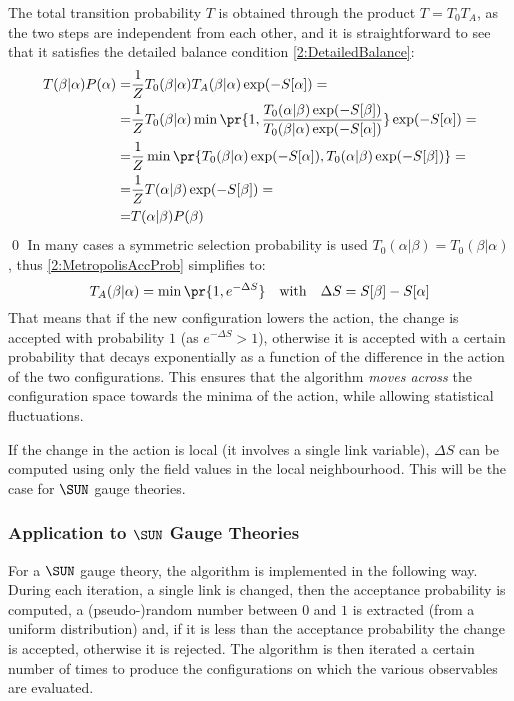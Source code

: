 The total transition probability $T$ is obtained through the product $T=T_0T_A$, as the two steps are independent from each other, and it is straightforward to see that it satisfies the detailed balance condition \eqref{2:DetailedBalance}:
\begin{align*}
    T(\beta|\alpha)P(\alpha) =& \frac1Z T_0(\beta|\alpha)T_A(\beta|\alpha)\exp(-S[\alpha]) = \\
    =& \frac1Z T_0(\beta|\alpha)\min\pr{1,\frac{T_0(\alpha|\beta)\exp(-S[\beta])}{T_0(\beta|\alpha)\exp(-S[\alpha])}}\exp(-S[\alpha]) = \\
    =& \frac1Z \min\pr{T_0(\beta|\alpha)\exp(-S[\alpha]), T_0(\alpha|\beta)\exp(-S[\beta])} = \\
    =& \frac1Z T(\alpha|\beta)\exp(-S[\beta]) = \\
    =& T(\alpha|\beta)P(\beta)
\end{align*}
\qed
In many cases a symmetric selection probability is used $T_0(\alpha|\beta)=T_0(\beta|\alpha)$, thus \eqref{2:MetropolisAccProb} simplifies to:
\begin{equation}
    T_A(\beta|\alpha) = \min\pr{1, e^{-\Delta S}} \quad \text{with} \quad \Delta S = S[\beta]-S[\alpha] \label{2:MetropolisAccProbSymm}
\end{equation}
That means that if the new configuration lowers the action, the change is accepted with probability $1$ (as $e^{-\Delta S}>1$), otherwise it is accepted with a certain probability that decays exponentially as a function of the difference in the action of the two configurations.
This ensures that the algorithm \emph{moves across} the configuration space towards the minima of the action, while allowing statistical fluctuations.

If the change in the action is local (it involves a single link variable), $\Delta S$ can be computed using only the field values in the local neighbourhood. This will be the case for $\SUN$ gauge theories.

\subsubsection{Application to $\SUN$ Gauge Theories}
For a $\SUN$ gauge theory, the algorithm is implemented in the following way.
During each iteration, a single link is changed, then the acceptance probability is computed, a (pseudo-)random number between $0$ and $1$ is extracted (from a uniform distribution) and, if it is less than the acceptance probability the change is accepted, otherwise it is rejected.
The algorithm is then iterated a certain number of times to produce the configurations on which the various observables are evaluated.

